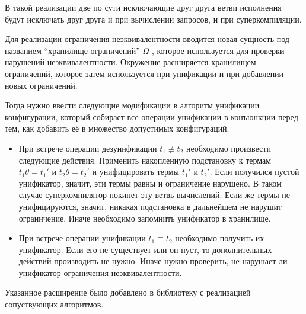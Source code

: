 В такой реализации две по сути исключающие друг друга ветви исполнения будут исключать друг друга
и при вычислении запросов, и при суперкомпиляции.

Для реализации ограничения неэквивалентности вводится новая сущность под названием
``хранилище ограничений'' $\Omega$ , которое используется для проверки
нарушений неэквивалентности. Окружение расширяется хранилищем ограничений, которое затем используется
при унификации и при добавлении новых ограничений.

Тогда нужно ввести следующие модификации в алгоритм унификации конфигурации, который собирает все
операции унификации в конъюнкции перед тем, как добавить её в множество допустимых конфигураций.
\begin{itemize}
\item При встрече операции дезунификации $t_1 \not\equiv t_2$ необходимо произвести следующие действия.
      Применить накопленную подстановку к термам $t_1 \theta = t_1'$ и $t_2 \theta = t_2'$ и 
      унифицировать термы $t_1'$ и $t_2'$. Если получился пустой унификатор, значит, эти термы
      равны и ограничение нарушено. В таком случае суперкомпилятор покинет эту
      ветвь вычислений. Если же термы не унифицируются, значит, никакая подстановка
      в дальнейшем не нарушит ограничение. Иначе необходимо запомнить унификатор в хранилище.
\item При встрече операции унификации $t_1 \equiv t_2$ необходимо получить их унификатор.
      Если его не существует или он пуст, то дополнительных действий производить не нужно.
	  Иначе нужно проверить, не нарушает ли унификатор ограничения неэквивалентности.
\end{itemize}

Указанное расширение было добавлено в библиотеку с реализацией сопуствующих алгоритмов.


